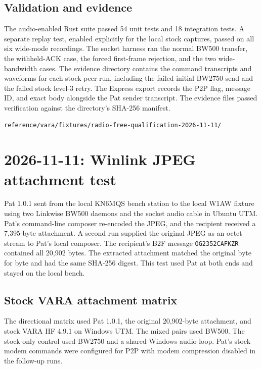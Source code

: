 \documentclass[11pt,a4paper]{article}
\newcommand{\pathtext}[1]{\path{#1}}
\begin{document}
\subsection{Validation and evidence}

The audio-enabled Rust suite passed 54 unit tests and 18 integration
tests. A separate replay test, enabled explicitly for the local stock
captures, passed on all six wide-mode recordings. The socket harness
ran the normal BW500 transfer, the withheld-ACK case, the forced
first-frame rejection, and the two wide-bandwidth cases. The evidence
directory contains the command transcripts and waveforms for each
stock-peer run, including the failed initial BW2750 send and the
failed stock level-3 retry. The Express export records the P2P flag,
message ID, and exact body alongside the Pat sender transcript. The
evidence files passed verification against the directory's SHA-256
manifest.

\begin{lstlisting}
reference/vara/fixtures/radio-free-qualification-2026-11-11/
\end{lstlisting}

\section{2026-11-11: Winlink JPEG attachment test}

Pat 1.0.1 sent \pathtext{Photo 1.jpg} from the local KN6MQS bench
station to the local W1AW fixture using two Linkwise BW500 daemons
and the socket audio cable in Ubuntu UTM. Pat's command-line composer
re-encoded the JPEG, and the recipient received a 7,395-byte attachment.
A second run supplied the original JPEG as an octet stream to Pat's
local composer. The recipient's B2F message \texttt{OG2352CAFKZR}
contained all 20,902 bytes. The extracted attachment matched the
original byte for byte and had the same SHA-256 digest. This test
used Pat at both ends and stayed on the local bench.

\subsection{Stock VARA attachment matrix}

The directional matrix used Pat 1.0.1, the original 20,902-byte
attachment, and stock VARA HF 4.9.1 on Windows UTM. The mixed pairs
used BW500. The stock-only control used BW2750 and a shared Windows
audio loop. Pat's stock modem commands were configured for P2P with
modem compression disabled in the follow-up runs.
\end{document}
